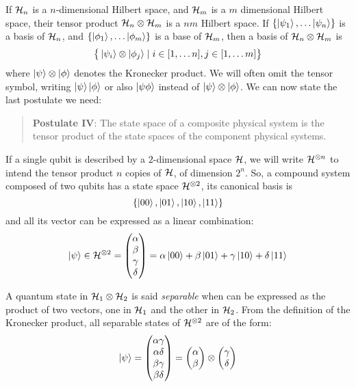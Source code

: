 If $\mathcal{H}_n$ is a $n$-dimensional Hilbert space, and $\mathcal{H}_m$ is a $m$ dimensional Hilbert space, their tensor product $\mathcal{H}_n \otimes \mathcal{H}_m$ is a $nm$ Hilbert space. If $\{\ket{\psi_1}, \ldots \ket{\psi_n}\}$ is a basis of $\mathcal{H}_n$, and $\{\ket{\phi_1}, \ldots\ket{\phi_m}\}$ is a base of $\mathcal{H}_m$, then a basis of $\mathcal{H}_n \otimes \mathcal{H}_m$ is\[\big\{\ket{\psi_i}\otimes\ket{\phi_j} \mid i \in [1, \ldots n], j \in [1, \ldots m] \big\}\]
 where $\ket{\psi} \otimes \ket{\phi}$ denotes the Kronecker product. We will often omit the tensor symbol, writing $\ket{\psi}\ket{\phi}$ or also $\ket{\psi\phi}$ instead of $\ket{\psi}\otimes\ket{\phi}$. We can now state the last postulate we need:

\begin{quote}
\textbf{Postulate IV}: The state space of a composite physical system is the tensor product of the state spaces of the component physical systems. 
\end{quote}

If a single qubit is described by a $2$-dimensional space $\mathcal{H}$, we will write $\mathcal{H}^{\otimes n}$ to intend the tensor product $n$ copies of $\mathcal{H}$, of dimension $2^n$. So, a compound system composed of two qubits has a state space $\mathcal{H}^{\otimes 2}$, its canonical basis is 
\[\{\ket{00}, \ket{01}, \ket{10}, \ket{11}\}\]
and all its vector can be expressed as a linear combination:
\[\ket{\psi} \in \mathcal{H}^{\otimes 2} = \begin{pmatrix}
\alpha \\ \beta \\ \gamma \\ \delta
\end{pmatrix} = \alpha\ket{00} + \beta\ket{01} + \gamma\ket{10} + \delta\ket{11}\]

A quantum state in $\mathcal{H}_1 \otimes \mathcal{H}_2$ is said \textit{separable} when can be expressed as the product of two vectors, one in $\mathcal{H}_1$ and the other in $\mathcal{H}_2$. From the definition of the Kronecker product, all separable states of $\mathcal{H}^{\otimes 2}$ are of the form:
\[
 \ket{\psi} = \begin{pmatrix}
 \alpha\gamma \\ \alpha\delta \\ \beta\gamma \\ \beta\delta
 \end{pmatrix} = 
 \begin{pmatrix}
 \alpha \\ \beta
 \end{pmatrix} \otimes 
 \begin{pmatrix}
 \gamma \\ \delta
 \end{pmatrix}
\]

